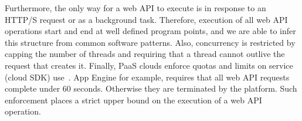 Furthermore, the only way for a web API to execute is in response
to an HTTP/S request or as a background task.  Therefore, execution of
all web API operations start and end at well defined program points, and
we are able to infer this structure from common software patterns.  Also,
concurrency is restricted by capping the number of threads
and requiring that a thread cannot outlive the request
that creates it.  Finally, PaaS clouds enforce quotas and limits on service
(cloud SDK) use~\cite{azure-limits,gae-limits,gae-sandbox}.
App Engine for example, requires that all web API requests complete under 60 seconds.
Otherwise they are terminated by the platform. 
Such enforcement places a strict upper bound on the
execution of a web API operation.
